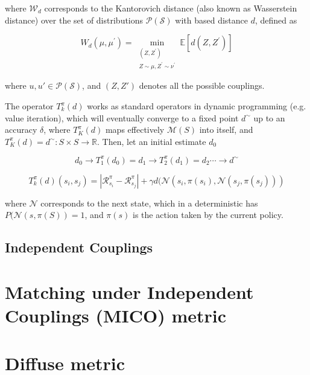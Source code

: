 where $\mathcal{W}_d$ corresponds to the Kantorovich distance (also known as Wasserstein distance) over the set of distributions $\mathcal{P}(\mathcal{S})$ with based distance $d$, defined as

\begin{equation}
W_d\left(\mu, \mu^{\prime}\right)=\min _{\substack{\left(Z, Z^{\prime}\right) \\ Z \sim \mu, Z^{\prime} \sim \nu^{\prime}}} \mathbb{E}\left[d\left(Z, Z^{\prime}\right)\right]
\end{equation}

where $u, u'\in \mathcal{P}(\mathcal{S})$, and $(Z,Z')$ denotes all the possible couplings.

The operator $T^\pi_k(d)$ works as standard operators in dynamic programming (e.g. value iteration), which will eventually converge to a fixed point $d^\sim$ up to an accuracy $\delta$, where $T^\pi_K(d)$ maps effectively $\mathcal{M}(S)$ into itself, and $T^\pi_K(d) = d^\sim : S \times S \rightarrow \mathbb{R}$. Then, let an initial estimate $d_0$

$$d_0 \rightarrow T^\pi_1(d_0) = d_1 \rightarrow T^\pi_2(d_1) = d_2 \cdots \rightarrow d^\sim$$

\begin{equation}
    T^\pi_k(d)(s_i, s_j) = |\mathcal{R}^\pi_{s_i} - \mathcal{R}^\pi_{s_j}| + \gamma d(\mathcal{N}(s_i,\pi(s_i),\mathcal{N}(s_j,\pi(s_j))) 
\end{equation}

where $\mathcal{N}$ corresponds to the next state, which in a deterministic has $P(\mathcal{N}(s,\pi(S)) = 1$, and $\pi(s)$ is the action taken by the current policy.

\subsection{Independent Couplings}

\section{Matching under Independent Couplings (MICO) metric}

\section{Diffuse metric}












